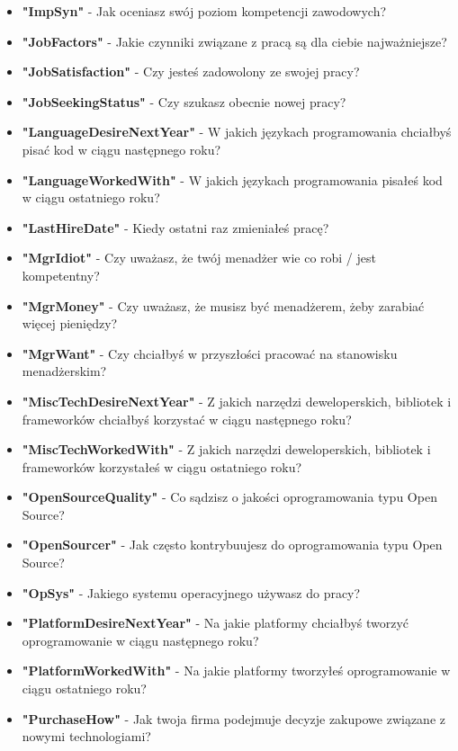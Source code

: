 \begin{appendices}
\begin{itemize}
        \item \textbf{"ImpSyn"} - Jak oceniasz swój poziom kompetencji zawodowych?
        \item \textbf{"JobFactors"} - Jakie czynniki związane z pracą są dla ciebie najważniejsze?
        \item \textbf{"JobSatisfaction"} - Czy jesteś zadowolony ze swojej pracy?
        \item \textbf{"JobSeekingStatus"} - Czy szukasz obecnie nowej pracy?
        \item \textbf{"LanguageDesireNextYear"} - W jakich językach programowania chciałbyś pisać kod w ciągu następnego roku?
        \item \textbf{"LanguageWorkedWith"} - W jakich językach programowania pisałeś kod w ciągu ostatniego roku?
        \item \textbf{"LastHireDate"} - Kiedy ostatni raz zmieniałeś pracę?
        \item \textbf{"MgrIdiot"} - Czy uważasz, że twój menadżer wie co robi / jest kompetentny?
        \item \textbf{"MgrMoney"} - Czy uważasz, że musisz być menadżerem, żeby zarabiać więcej pieniędzy?
        \item \textbf{"MgrWant"} - Czy chciałbyś w przyszłości pracować na stanowisku menadżerskim?
        \item \textbf{"MiscTechDesireNextYear"} - Z jakich narzędzi deweloperskich, bibliotek i frameworków chciałbyś korzystać w ciągu następnego roku?
        \item \textbf{"MiscTechWorkedWith"} - Z jakich narzędzi deweloperskich, bibliotek i frameworków korzystałeś w ciągu ostatniego roku?
        \item \textbf{"OpenSourceQuality"} - Co sądzisz o jakości oprogramowania typu Open Source?
        \item \textbf{"OpenSourcer"} - Jak często kontrybuujesz do oprogramowania typu Open Source?
        \item \textbf{"OpSys"} - Jakiego systemu operacyjnego używasz do pracy?
        \item \textbf{"PlatformDesireNextYear"} - Na jakie platformy chciałbyś tworzyć oprogramowanie w ciągu następnego roku?
        \item \textbf{"PlatformWorkedWith"} - Na jakie platformy tworzyłeś oprogramowanie w ciągu ostatniego roku?
        \item \textbf{"PurchaseHow"} - Jak twoja firma podejmuje decyzje zakupowe związane z nowymi technologiami?

\end{itemize}
\end{appendices}
